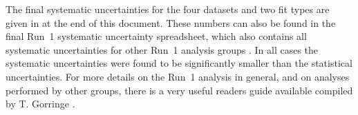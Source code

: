 The final systematic uncertainties for the four datasets and two fit types are given in  at the end of this document. These numbers can also be found in the final Run~1 systematic uncertainty spreadsheet, which also contains all systematic uncertainties for other Run~1 analysis groups \cite{UncertaintySpreadsheet}. In all cases the systematic uncertainties were found to be significantly smaller than the statistical uncertainties. For more details on the Run~1 analysis in general, and on analyses performed by other groups, there is a very useful readers guide available compiled by T. Gorringe \cite[and references therein]{ReadersGuide}.

